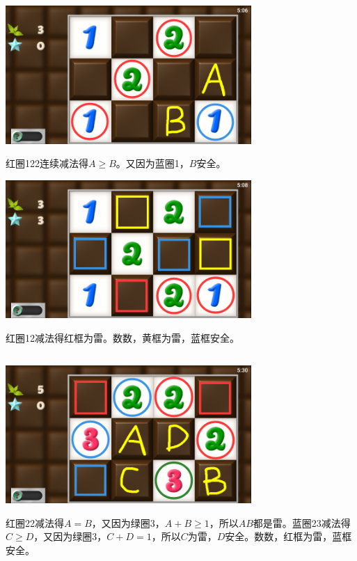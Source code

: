 \subsection{} %
\begin{center}
    \includegraphics[width=0.7\textwidth]{puzzle/59-1.png}
\end{center}
红圈122连续减法得$A\ge B$。又因为蓝圈1，$B$安全。
\begin{center}
    \includegraphics[width=0.7\textwidth]{puzzle/59-2.png}
\end{center}
红圈12减法得红框为雷。数数，黄框为雷，蓝框安全。

\subsection{} %
\begin{center}
    \includegraphics[width=0.7\textwidth]{puzzle/60-1.png}
\end{center}
红圈22减法得$A=B$，又因为绿圈3，$A+B\ge 1$，所以$AB$都是雷。蓝圈23减法得$C\ge D$，又因为绿圈3，$C+D=1$，所以$C$为雷，$D$安全。数数，红框为雷，蓝框安全。

